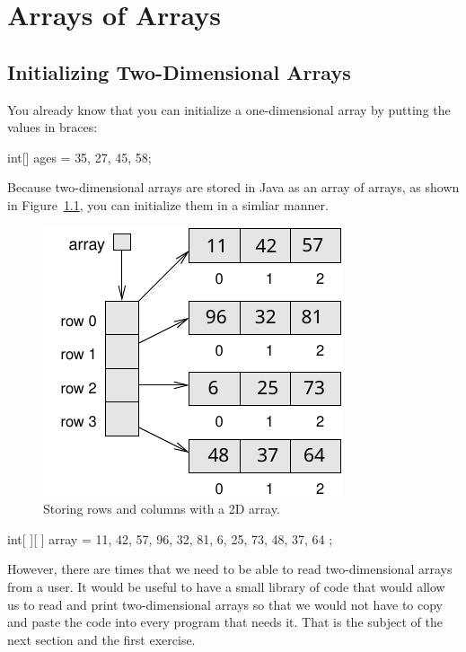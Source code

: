 \chapter{Arrays of Arrays}

\section{Initializing Two-Dimensional Arrays}
You already know that you can initialize a one-dimensional array by putting the values in braces:

\begin{code}
int[] ages = {35, 27, 45, 58};
\end{code}

Because two-dimensional arrays are stored in Java as an array of arrays, as shown in Figure~\ref{fig:2D-array}, you can initialize them in a simliar manner.

\begin{figure}[!ht]
\begin{center}
\includegraphics{figs/ch15/2D-array.pdf}
\caption{Storing rows and columns with a 2D array.}
\label{fig:2D-array} 
\end{center}
\end{figure}

\begin{code}
int[ ][ ] array = {
    {11, 42, 57},
    {96, 32, 81},
    { 6, 25, 73},
    {48, 37, 64}
};
\end{code}

However, there are times that we need to be able to read two-dimensional arrays from a user. It would be useful to have a small library of code that would allow us to read and print two-dimensional arrays so that we would not have to copy and paste the code into every program that needs it. That is the subject of the next section and the first exercise.

